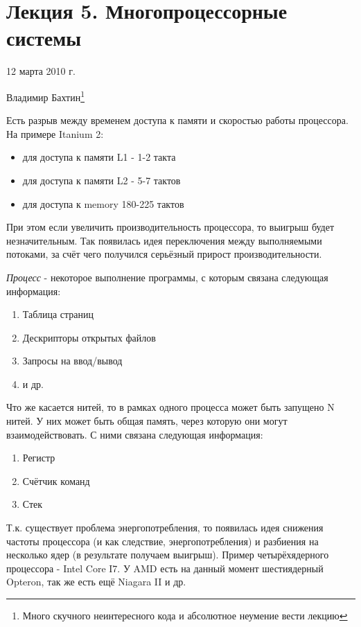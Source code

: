 \documentclass[a4paper,12pt]{article}
\begin{document}
	\section{\bf Лекция 5. Многопроцессорные системы}
	\centerline{12 марта 2010 г.}
	\centerline{Владимир Бахтин\footnote{Много скучного неинтересного кода и абсолютное 
неумение вести лекцию}}
	Есть разрыв между временем доступа к памяти и скоростью работы процессора. На примере
Itanium 2:
	\begin{itemize}
		\item для доступа к памяти L1 - 1-2 такта
		\item для доступа к памяти L2 - 5-7 тактов
		\item для доступа к memory 180-225 тактов
	\end{itemize}
	При этом если увеличить производительность процессора, то выигрыш будет незначительным.
Так появилась идея переключения между выполняемыми потоками, за счёт чего получился серьёзный
прирост производительности.

	{\em Процесс} - некоторое выполнение программы, с которым связана следующая информация:
	\begin{enumerate}
		\item Таблица страниц
		\item Дескрипторы открытых файлов
		\item Запросы на ввод/вывод
		\item и др.
	\end{enumerate}		
	Что же касается нитей, то в рамках одного процесса может быть запущено N нитей. У них
может быть общая память, через которую они могут взаимодействовать. С ними связана следующая
информация:
	\begin{enumerate}
		\item Регистр
		\item Счётчик команд
		\item Стек
	\end{enumerate}
	Т.к. существует проблема энергопотребления, то появилась идея снижения частоты процессора 
(и как следствие, энергопотребления) и разбиения на несколько ядер (в результате получаем
выигрыш). Пример четырёхядерного процессора - Intel Core I7. У AMD есть на данный момент 
шестиядерный Opteron, так же есть ещё Niagara II и др.
	
\end{document}
